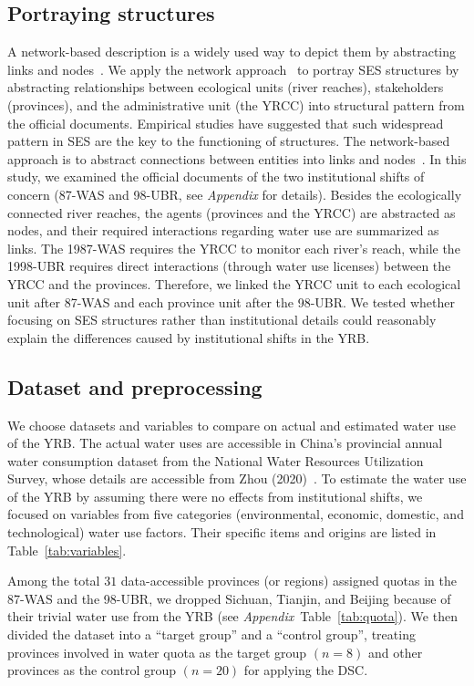 \subsection{Portraying structures}\label{sec:structures}
A network-based description is a widely used way to depict them by abstracting links and nodes~\cite{bodin2017a,kluger2020,guerrero2015}.
We apply the network approach~\cite{bodin2017b} to portray SES structures by abstracting relationships between ecological units (river reaches), stakeholders (provinces), and the administrative unit (the YRCC) into structural pattern from the official documents.
Empirical studies have suggested that such widespread pattern in SES are the key to the functioning of structures. The network-based approach is to abstract connections between entities into links and nodes~\cite{bodin2017a,kluger2020,guerrero2015}.
In this study, we examined the official documents of the two institutional shifts of concern (87-WAS and 98-UBR, see \textit{Appendix } for details).
Besides the ecologically connected river reaches, the agents (provinces and the YRCC) are abstracted as nodes, and their required interactions regarding water use are summarized as links.
The 1987-WAS requires the YRCC to monitor each river's reach, while the 1998-UBR requires direct interactions (through water use licenses) between the YRCC and the provinces.
Therefore, we linked the YRCC unit to each ecological unit after 87-WAS and each province unit after the 98-UBR.
We tested whether focusing on SES structures rather than institutional details could reasonably explain the differences caused by institutional shifts in the YRB.

\subsection{Dataset and preprocessing}\label{sec:dataset}
We choose datasets and variables to compare on actual and estimated water use of the YRB.
The actual water uses are accessible in China’s provincial annual water consumption dataset from the National Water Resources Utilization Survey, whose details are accessible from Zhou (2020)~\cite{zhou2020}.
To estimate the water use of the YRB by assuming there were no effects from institutional shifts, we focused on variables from five categories (environmental, economic, domestic, and technological) water use factors. Their specific items and origins are listed in Table~\ref{tab:variables}.

Among the total $31$ data-accessible provinces (or regions) assigned quotas in the 87-WAS and the 98-UBR, we dropped Sichuan, Tianjin, and Beijing because of their trivial water use from the YRB (see \textit{Appendix}~Table~\ref{tab:quota}). We then divided the dataset into a ``target group'' and a ``control group'', treating provinces involved in water quota as the target group $(n=8)$ and other provinces as the control group $(n=20)$ for applying the DSC.


